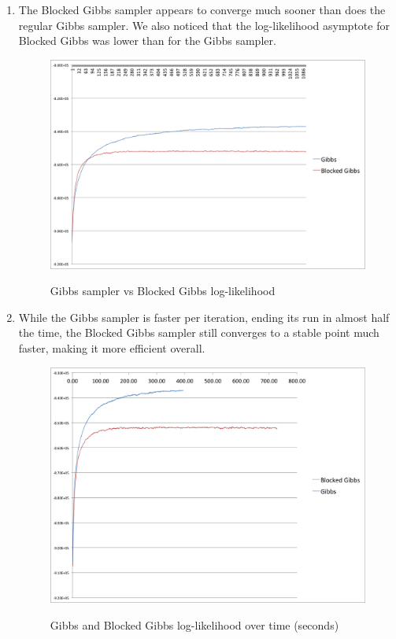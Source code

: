 \documentclass[12pt, letterpaper]{article}
\begin{document}
\begin{enumerate}[1.]
\begin{figure}[ht]
        \end{figure}

    \item 
        The Blocked Gibbs sampler appears to converge much sooner than does the regular Gibbs sampler. We also noticed that the log-likelihood asymptote for Blocked Gibbs was lower than for the Gibbs sampler.

        \begin{figure}[ht]
            \caption{Gibbs sampler vs Blocked Gibbs log-likelihood}
            \includegraphics[scale=0.5]{ml_graph_2}\\
        \end{figure}

   \item
       While the Gibbs sampler is faster per iteration, ending its run in almost half the time, the Blocked Gibbs sampler still converges to a stable point much faster, making it more efficient overall.

        \begin{figure}[ht]
            \caption{Gibbs and Blocked Gibbs log-likelihood over time (seconds)}
            \includegraphics[scale=0.5]{ml_graph_3}\\
        \end{figure}


\end{enumerate}
\end{document}
